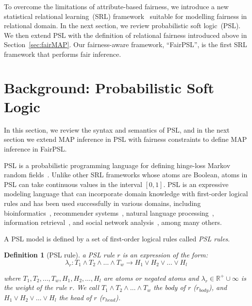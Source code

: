 \documentclass[11pt]{article}
\newtheorem{mydef}{\textbf{Definition}}
\begin{document}
To overcome the limitations of attribute-based fairness, we introduce a new statistical relational learning~(SRL) framework~\cite{getoor2007introduction} suitable for modelling fairness in relational domain. In the next section, we review probabilistic soft logic~(PSL). We then extend PSL with the definition of relational fairness introduced above in Section~\ref{sec:fairMAP}. Our fairness-aware framework, ``FairPSL'', is the first SRL framework that performs fair inference. 

\section{Background: Probabilistic Soft Logic}
\label{sec:psl}

In this section, we review the syntax and semantics of PSL, and in the next section we extend MAP inference in PSL with fairness constraints to define MAP inference in FairPSL.

PSL is a probabilistic programming language for defining hinge-loss Markov random fields~\cite{bach:jmlr17}. Unlike other SRL frameworks whose atoms are Boolean, atoms in PSL can take continuous values in the interval $[0,1]$. PSL is an expressive modeling language that can incorporate domain knowledge with first-order logical rules and has been used successfully in various domains, including bioinformatics~\cite{sridhar:bioinformatics16}, recommender systems~\cite{kouki:recsys15}, natural language processing~\cite{ebrahimi:emnlp16}, information retrieval~\cite{alshukaili:iswc16}, and social network analysis~\cite{west2014exploiting}, among many others. 
 
A PSL model is defined by a set of first-order logical rules called \emph{PSL rules}.

\begin{mydef} [PSL rule] a PSL rule $r$ is an expression of the form:
{\begin{equation}
\lambda_{r}: T_1 \land T_2 \land \ldots \land T_w \rightarrow H_1 \vee H_2 \vee \ldots \vee H_l
\end{equation}}

where { $T_1, T_2, \ldots, T_w, H_1, H_2, \ldots, H_l$} are atoms or negated atoms and { $\lambda_{r} \in \mathbb{R}^{+} \cup \infty$} is the weight of the rule $r$.  We call { $T_1 \land T_2 \land \ldots \land T_w$} the body of $r$ ($r_{body}$), and { $H_1 \vee H_2 \vee \ldots \vee H_l$} the head of $r$ ($r_{head}$).
\end{mydef}
\end{document}

